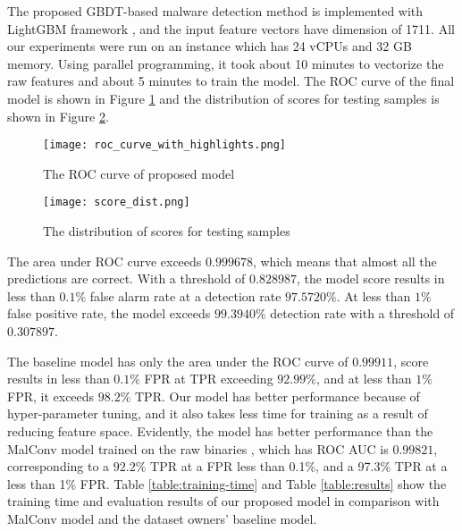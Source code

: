 The proposed GBDT-based malware detection method is implemented with LightGBM framework \cite{ke2017lightgbm}, and the input feature vectors have dimension of 1711. All our experiments were run on an instance which has 24 vCPUs and 32 GB memory. Using parallel programming, it took about 10 minutes to vectorize the raw features and about 5 minutes to train the model. The ROC curve of the final model is shown in Figure \ref{fig:roc_curve_with_highlights} and the distribution of scores for testing samples is shown in Figure \ref{fig:score_dist}.

\begin{figure}[H]
\centering
\texttt{[image: roc\_curve\_with\_highlights.png]}
\caption{The ROC curve of proposed model}
\label{fig:roc_curve_with_highlights}
\end{figure}

\begin{figure}[H] 
\centering
\texttt{[image: score\_dist.png]}
\caption{The distribution of scores for testing samples}
\label{fig:score_dist}
\end{figure}

The area under ROC curve exceeds $0.999678$, which means that almost all the predictions are correct. With a threshold of $0.828987$, the model score results in less than $0.1\%$ false alarm rate at a detection rate $97.5720\%$. At less than $1\%$ false positive rate, the model exceeds $99.3940\%$ detection rate with a threshold of $0.307897$. 

The baseline model has only the area under the ROC curve of $0.99911$, score results in less than $0.1\%$ FPR at TPR exceeding $92.99\%$, and at less than $1\%$ FPR, it exceeds $98.2\%$ TPR. Our model has better performance because of hyper-parameter tuning, and it also takes less time for training as a result of reducing feature space. Evidently, the model has better performance than the MalConv model trained on the raw binaries \cite{anderson2018ember}, which has ROC AUC is $0.99821$, corresponding to a $92.2\%$ TPR at a FPR less than 0.1\%, and a 97.3\% TPR at a less than 1\% FPR. Table \ref{table:training-time} and Table \ref{table:results} show the training time and evaluation results of our proposed model in comparison with MalConv model and the dataset owners’ baseline model.

